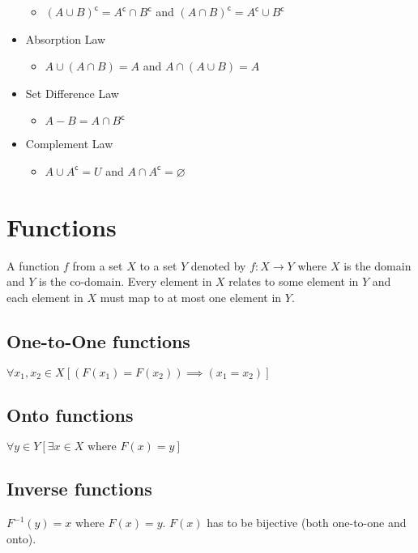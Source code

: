 \documentclass[landscape, letterpaper, 8pt]{extarticle}
\renewcommand{\complement}[1]{{#1}^\mathsf{c}}
\begin{document}
\begin{multicols}{3}
\begin{itemize}[noitemsep,nolistsep]
\begin{itemize}[noitemsep,nolistsep]
                  \item $\complement{(A \cup B)} = \complement{A} \cap \complement{B}$ and $\complement{(A \cap B)} = \complement{A} \cup \complement{B}$
              \end{itemize}
        \item Absorption Law
              \begin{itemize}[noitemsep,nolistsep]
                  \item $A \cup (A \cap B) = A$ and $A \cap (A \cup B) = A$
              \end{itemize}
        \item Set Difference Law
              \begin{itemize}[noitemsep,nolistsep]
                  \item $A-B = A \cap \complement{B}$
              \end{itemize}
        \item Complement Law
              \begin{itemize}[noitemsep,nolistsep]
                  \item $A\cup \complement{A} = U$ and $A \cap \complement{A} = \varnothing$
              \end{itemize}
    \end{itemize}
    \section*{Functions}
    A function $f$ from a set $X$ to a set $Y$ denoted by $f: X \to Y$ where $X$ is the domain and $Y$ is the co-domain.
    Every element in $X$ relates to some element in $Y$ and each element in $X$ must map to at most one element in $Y$.
    \subsection*{One-to-One functions}
    $\forall x_1, x_2 \in X[(F(x_1) = F(x_2)) \implies (x_1 = x_2)]$
    \subsection*{Onto functions}
    $\forall y \in Y[ \exists x \in X \text{ where } F(x)=y]$
    \subsection*{Inverse functions}
    $F^{-1}(y) = x\text{ where }F(x) = y$.
    $F(x)$ has to be bijective (both one-to-one and onto).

\end{multicols}
\end{document}
